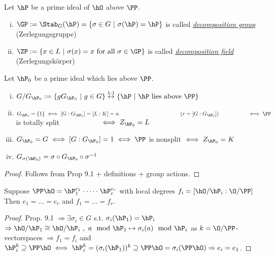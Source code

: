 \begin{defi}
Let $\hP$ be a prime ideal of $\hO$ above $\PP$.
\begin{enumerate}[i)]
\item $\GP := \Stab_G(\hP)=\{\sigma \in G \ | \ \sigma(\hP)=\hP\}$ is called \emph{\underline{decomposition group}} (\glqq Zerlegungsgruppe\grqq)
\item $\ZP := \{ x \in L \ | \ \sigma(x) = x \text{ for all } \sigma \in \GP\}$ is called \emph{\underline{decomposition field}} (\glqq Zerlegungskörper\grqq)
\end{enumerate}
\end{defi}

\begin{Bem}
Let $\hP_0$ be a prime ideal which lies above $\PP$.
\begin{enumerate}[i)]
\item $G/G_{\hP_0}:=\{gG_{\hP_0} \ | \ g \in G\} \stackrel{1:1}{\leftrightarrow} \{\hP \ | \ \hP \text{ lies above } \PP\}$
\item $G_{\hP_0}=\{1\} \iff [G:G_{\hP_0}]=[L:K]=n \hspace*{4cm} (r=[G:G_{\hP_0}])\\
 \phantom{G_{\hP_0}=\{1\}}\iff \PP$ is totally split $\\
 \phantom{G_{\hP_0}=\{1\}}\iff Z_{\hP_0} =L$
\item $G_{\hP_0}=G \iff [G:G_{\hP_0}]=1 \iff \PP$ is nonsplit $\iff Z_{\hP_0} =K$
\item $G_{\sigma(\hP_0)}=\sigma \circ G_{\hP_0} \circ \sigma^{-1}$
\end{enumerate}
\end{Bem}
\begin{proof}
Follows from Prop 9.1 + definitions + group actions.
\end{proof}

\begin{Bem}
Suppose $\PP \hO = \hP_1^{e_1}\cdot \dots \cdot \hP_r^{e_r}$ with local degrees $f_i=[\hO/\hP_i : \O/\PP]$\\
Then $e_1=\dots=e_r$ and $f_1=\dots=f_r$.
\end{Bem}
\begin{proof}
Prop. 9.1 $\Rightarrow \exists \sigma_i \in G$ s.t. $\sigma_i(\hP_1)=\hP_i$\\
$\Rightarrow \hO/\hP_1 \cong \hO/\hP_i \ , \ a \mod \hP_1 \mapsto \sigma_i(a) \mod \hP_i$ as $k=\O/\PP$-vectorspaces $\Rightarrow f_1=f_i$ and $\hP_i^k \supseteq \PP\hO \iff \hP_i^k = (\sigma_i(\hP_1))^k \supseteq \PP\hO=\sigma_i(\PP \hO) \Rightarrow e_i = e_1$.
\end{proof}

